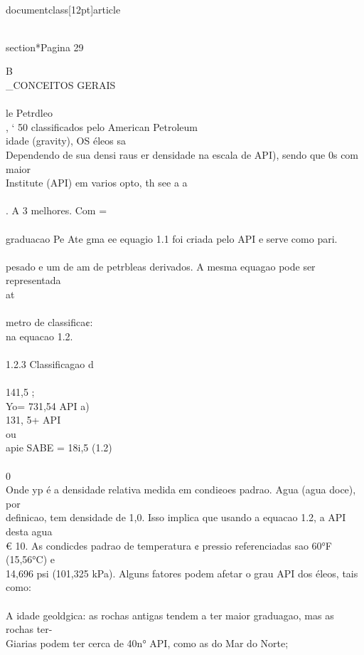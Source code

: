 \\documentclass[12pt]{article}
\begin{document}
{\\section*{Pagina 29}

B \\_CONCEITOS GERAIS\\
\\
le Petrdleo\\
, ‘ 50 classificados pelo American Petroleum\\
idade (gravity), OS éleos sa\\
Dependendo de sua densi raus er densidade na escala de API), sendo que 0s com maior\\
Institute (API) em varios opto, th see a a\\
\\
. A 3 melhores. Com =\\
\\
graduacao Pe Ate gma ee equagio 1.1 foi criada pelo API e serve como pari.\\
\\
pesado e um de am de petrbleas derivados. A mesma equagao pode ser representada\\
at\\
\\
metro de classifica¢:\\
na equacao 1.2.\\
\\
1.2.3 Classificagao d\\
\\
141,5 ;\\
Yo= 731,54 API a)\\
131, 5+ API\\
ou\\
apie SABE = 18i,5 (1.2)\\
\\
0\\
Onde yp é a densidade relativa medida em condi¢oes padrao. Agua (agua doce), por\\
definicao, tem densidade de 1,0. Isso implica que usando a equacao 1.2, a API desta agua\\
€ 10. As condicdes padrao de temperatura ¢ pressio referenciadas sao 60°F (15,56°C) e\\
14,696 psi (101,325 kPa). Alguns fatores podem afetar o grau API dos éleos, tais como:\\
\\
A idade geoldgica: as rochas antigas tendem a ter maior graduagao, mas as rochas ter-\\
Giarias podem ter cerca de 40n° API, como as do Mar do Norte;\\
}
\end{document}
